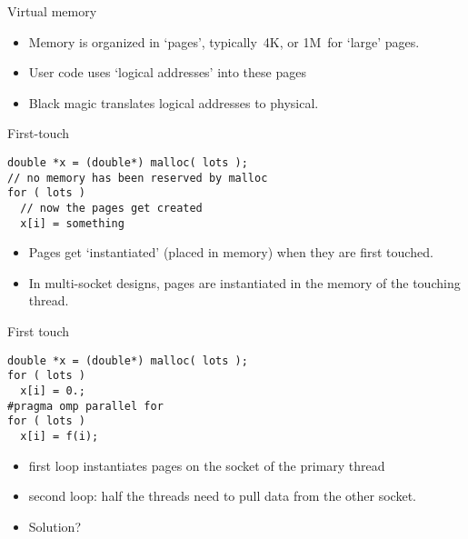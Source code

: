 \begin{numberedframe}{Virtual memory}
\begin{itemize}
\item
  Memory is organized in `pages', typically~4K, or 1M~for `large' pages.
\item User code uses `logical addresses' into these pages
\item Black magic translates logical addresses to physical.
\end{itemize}
\end{numberedframe}

\begin{numberedframe}{First-touch}
\begin{lstlisting}
double *x = (double*) malloc( lots );
// no memory has been reserved by malloc
for ( lots )
  // now the pages get created
  x[i] = something
\end{lstlisting}

  \begin{itemize}
  \item Pages get `instantiated' (placed in memory) when they are first touched.
  \item In multi-socket designs, pages are instantiated
    in the memory of the touching thread.
  \end{itemize}
\end{numberedframe}

\begin{numberedframe}{First touch}
\begin{lstlisting}
double *x = (double*) malloc( lots );
for ( lots )
  x[i] = 0.;
#pragma omp parallel for
for ( lots )
  x[i] = f(i);
\end{lstlisting}
  \begin{itemize}
  \item first loop instantiates pages on the socket
    of the primary thread
  \item second loop: half the threads need to pull
    data from the other socket.
  \item Solution?
  \end{itemize}
\end{numberedframe}


\endinput

\begin{numberedframe}{}
\begin{lstlisting}
\end{lstlisting}
  \begin{itemize}
  \item 
  \end{itemize}
\end{numberedframe}

